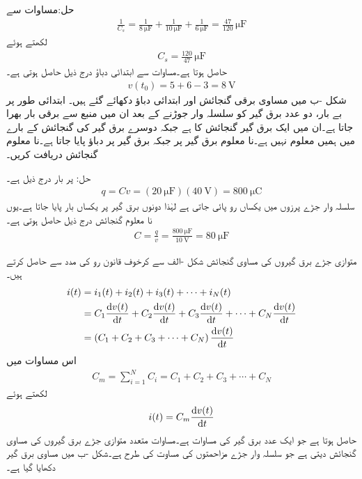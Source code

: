 حل:مساوات  سے
\begin{align*}
\frac{1}{C_s}=\frac{1}{\SI{8}{\micro\farad}}+\frac{1}{\SI{10}{\micro\farad}}+\frac{1}{\SI{6}{\micro\farad}}=\frac{47}{120}\,\si{\micro\farad}
\end{align*}
لکھتے ہوئے
\begin{align*}
C_s=\frac{120}{47} \, \si{\micro\farad}
\end{align*}
حاصل ہوتا ہے۔مساوات  سے ابتدائی دباؤ درج ذیل حاصل ہوتی ہے۔
\begin{align*}
v(t_0)=5+6-3=\SI{8}{\volt}
\end{align*}
شکل -ب میں مساوی برقی گنجائش اور ابتدائی دباؤ دکھائے گئے ہیں۔
ابتدائی طور پر بے بار، دو عدد برق گیر کو سلسلہ وار جوڑنے کے بعد ان میں  منبع سے برقی بار بھرا جاتا ہے۔ان میں ایک برق گیر  گنجائش کا ہے جبکہ دوسرے برق گیر کی گنجائش کے بارے میں ہمیں معلوم نہیں ہے۔نا معلوم برق گیر پر  جبکہ  برق گیر پر  دباؤ پایا جاتا ہے۔نا معلوم  گنجائش دریافت کریں۔

حل: پر بار درج ذیل ہے۔
\begin{align*}
q=C v=\left(\SI{20}{\micro\farad}\right)(\SI{40}{\volt})=\SI{800}{\micro\coulomb}
\end{align*} 
سلسلہ وار جڑے پرزوں میں یکساں رو پائی جاتی ہے لہٰذا دونوں برق گیر پر یکساں بار پایا جاتا ہے۔یوں نا معلوم گنجائش درج ذیل حاصل ہوتی ہے۔
\begin{align*}
C=\frac{q}{v}=\frac{\SI{800}{\micro\farad}}{\SI{10}{\volt}}=\SI{80}{\micro\farad}
\end{align*}

متوازی جڑے برق گیروں کی مساوی گنجائش شکل -الف سے کرخوف قانون رو کی مدد سے حاصل کرتے ہیں۔
\begin{align*}
i(t)&=i_1(t)+i_2(t)+i_3(t)+\cdots +i_N(t)\\
&=C_1 \frac{\dif v(t)}{\dif t}+C_2 \frac{\dif v(t)}{\dif t}+C_3 \frac{\dif v(t)}{\dif t}+\cdots+C_N \frac{\dif v(t)}{\dif t}\\
&=\left(C_1+C_2+C_3+\cdots+C_N\right) \frac{\dif v(t)}{\dif t}
\end{align*}
اس مساوات میں 
\begin{align}\label{مساوات_امالہ_متوازی_برق_گیر_کا_مساوی}
C_m=\sum_{i=1}^{N} C_i=C_1+C_2+C_3+\cdots +C_N
\end{align}
لکھتے ہوئے
\begin{align}
i(t)=C_m \frac{\dif v(t)}{\dif t}
\end{align}
حاصل ہوتا ہے جو ایک عدد برق گیر کی مساوات ہے۔مساوات  متعدد متوازی جڑے برق گیروں کی مساوی گنجائش دیتی ہے جو سلسلہ وار جڑے مزاحمتوں کی مساوت کی طرح ہے۔شکل -ب میں مساوی برق گیر دکھایا گیا ہے۔

